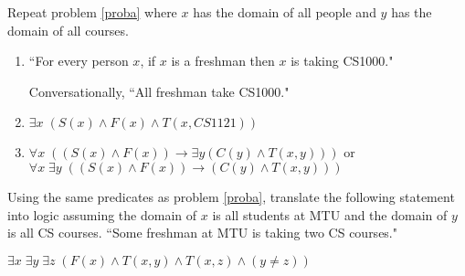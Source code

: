 \documentclass[10pt,addpoints]{exam}
\newcommand{\ra}{\rightarrow}
\begin{document}
\begin{questions}
\question[6] Repeat problem \ref{proba} where $x$ has the domain of all people and $y$ has the domain of all courses.
    \ifprintanswers
        \vspace{-12pt}
    \fi
\begin{solution}
    \begin{enumerate}[label=(\alph*),itemsep=0pt,parsep=0pt,
    	topsep=0pt,partopsep=0pt]
        \item  ``For every person $x$, if $x$ is a freshman then $x$ is taking CS1000."

            Conversationally, ``All freshman take CS1000."
        \item $\exists x\; (S(x) \wedge F(x) \wedge T(x,CS 1121))$
        \item $\forall x\; ((S(x) \wedge F(x)) \ra \exists y (C(y) \wedge T(x,y)))$ or \\
        $\forall x\; \exists y\; ((S(x) \wedge F(x)) \ra (C(y) \wedge T(x,y)))$
    \end{enumerate}
\end{solution}


\bonusquestion[2] Using the same predicates as problem \ref{proba}, translate the following statement into logic assuming the domain of $x$ is all students at MTU and the domain of $y$ is all CS courses.
``Some freshman at MTU is taking two CS courses."
    \ifprintanswers
        \vspace{-12pt}
    \fi
\begin{solution}
	$\exists x\; \exists y\; \exists z\;(F(x) \wedge T(x,y) \wedge T(x,z) \wedge (y \neq z))$
\end{solution}




\end{questions}
\end{document}
